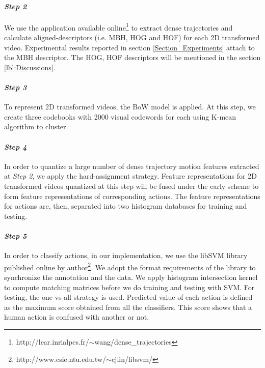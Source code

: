 \documentclass[final,3p,times,twocolumn]{elsarticle}
\begin{document}
\paragraph{\bf \textit{Step 2}}
We use the application available online\footnote{http://lear.inrialpes.fr/$\sim$wang/dense\_trajectories} to extract dense trajectories and calculate aligned-descriptors (i.e. MBH, HOG and HOF) for each 2D transformed video.
Experimental results reported in section \ref{Section_Experiments} attach to the MBH descriptor.
The HOG, HOF descriptors will be mentioned in the section \ref{lbl:Discussions}.

\paragraph{\bf \textit{Step 3}}
To represent 2D transformed videos, the BoW model is applied.
At this step, we create three codebooks with 2000 visual codewords for each using K-mean algorithm to cluster.

\paragraph{\bf \textit{Step 4}}
In order to quantize a large number of dense trajectory motion features extracted at {\it Step 2}, we apply the hard-assignment strategy.
Feature representations for 2D transformed videos quantized at this step will be fused under the early scheme to form feature representations of corresponding actions.
The feature representations for actions are, then, separated into two histogram databases for training and testing.

\paragraph{\bf \textit{Step 5}}
In order to classify actions, in our implementation, we use the libSVM library published online by author\footnote{http://www.csie.ntu.edu.tw/$\sim$cjlin/libsvm/}.
We adopt the format requirements of the library to synchronize the annotation and the data.
We apply histogram intersection kernel to compute matching matrices before we do training and testing with SVM.
For testing, the one-vs-all strategy is used.
Predicted value of each action is defined as the maximum score obtained from all the classifiers.
This score shows that a human action is confused with another or not.
\end{document}
